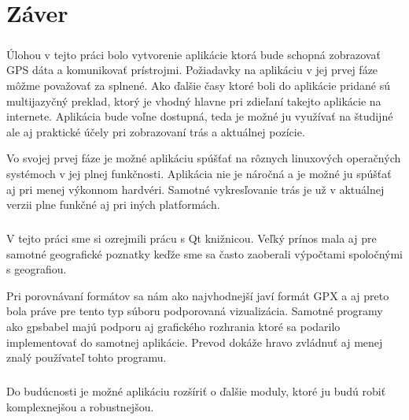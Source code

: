 \chapter*{Záver}
\paragraph{}
Úlohou v tejto práci bolo vytvorenie aplikácie ktorá bude schopná zobrazovať GPS dáta a komunikovať prístrojmi. Požiadavky na aplikáciu v jej prvej fáze môžme považovať za splnené. 
Ako ďalšie časy ktoré boli do aplikácie pridané sú multijazyčný preklad, ktorý je vhodný hlavne pri zdieľaní takejto aplikácie na internete. Aplikácia bude voľne dostupná, teda je možné ju využívať na študijné ale aj praktické účely pri zobrazovaní trás a aktuálnej pozície. 

Vo svojej prvej fáze je možné aplikáciu spúšťať na rôznych linuxových operačných systémoch v jej plnej funkčnosti. Aplikácia nie je náročná a je možné ju spúšťať aj pri menej výkonnom hardvéri. Samotné vykresľovanie trás je už v aktuálnej verzii plne funkčné aj pri iných platformách. 
\paragraph{}
V tejto práci sme si ozrejmili prácu s Qt knižnicou. Veľký prínos mala aj pre samotné geografické poznatky keďže sme sa často zaoberali výpočtami spoločnými s geografiou. 

Pri porovnávaní formátov sa nám ako najvhodnejší javí formát GPX a aj preto bola práve pre tento typ súboru podporovaná vizualizácia. Samotné programy ako gpsbabel majú podporu aj grafického rozhrania ktoré sa podarilo implementovať do samotnej aplikácie. Prevod dokáže hravo zvládnuť aj menej znalý používateľ tohto programu. 
\paragraph{}
Do budúcnosti je možné aplikáciu rozšíriť o ďalšie moduly, ktoré ju budú robiť komplexnejšou a robustnejšou.
